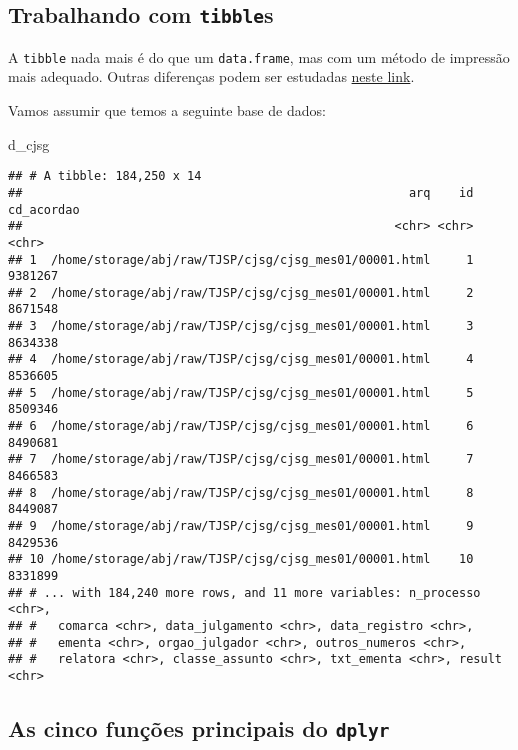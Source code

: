 \documentclass[]{book}
\newenvironment{Shaded}{\begin{snugshade}}{\end{snugshade}}
\newcommand{\NormalTok}[1]{{#1}}
\begin{document}
\subsection{\texorpdfstring{Trabalhando com
\texttt{tibble}s}{Trabalhando com tibbles}}\label{trabalhando-com-tibbles}

A \texttt{tibble} nada mais é do que um \texttt{data.frame}, mas com um
método de impressão mais adequado. Outras diferenças podem ser estudadas
\href{http://r4ds.had.co.nz/tibbles.html}{neste link}.

Vamos assumir que temos a seguinte base de dados:

\begin{Shaded}
\begin{Highlighting}[]
\NormalTok{d_cjsg}
\end{Highlighting}
\end{Shaded}

\begin{verbatim}
## # A tibble: 184,250 x 14
##                                                      arq    id cd_acordao
##                                                    <chr> <chr>      <chr>
## 1  /home/storage/abj/raw/TJSP/cjsg/cjsg_mes01/00001.html     1    9381267
## 2  /home/storage/abj/raw/TJSP/cjsg/cjsg_mes01/00001.html     2    8671548
## 3  /home/storage/abj/raw/TJSP/cjsg/cjsg_mes01/00001.html     3    8634338
## 4  /home/storage/abj/raw/TJSP/cjsg/cjsg_mes01/00001.html     4    8536605
## 5  /home/storage/abj/raw/TJSP/cjsg/cjsg_mes01/00001.html     5    8509346
## 6  /home/storage/abj/raw/TJSP/cjsg/cjsg_mes01/00001.html     6    8490681
## 7  /home/storage/abj/raw/TJSP/cjsg/cjsg_mes01/00001.html     7    8466583
## 8  /home/storage/abj/raw/TJSP/cjsg/cjsg_mes01/00001.html     8    8449087
## 9  /home/storage/abj/raw/TJSP/cjsg/cjsg_mes01/00001.html     9    8429536
## 10 /home/storage/abj/raw/TJSP/cjsg/cjsg_mes01/00001.html    10    8331899
## # ... with 184,240 more rows, and 11 more variables: n_processo <chr>,
## #   comarca <chr>, data_julgamento <chr>, data_registro <chr>,
## #   ementa <chr>, orgao_julgador <chr>, outros_numeros <chr>,
## #   relatora <chr>, classe_assunto <chr>, txt_ementa <chr>, result <chr>
\end{verbatim}

\subsection{\texorpdfstring{As cinco funções principais do
\texttt{dplyr}}{As cinco funções principais do dplyr}}\label{as-cinco-funcoes-principais-do-dplyr}
\end{document}
